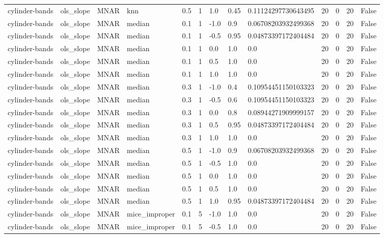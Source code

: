 \begin{tabular}{lllllllllllll}
cylinder-bands & ols\_slope & MNAR & knn & 0.5 & 1 & 1.0 & 0.45 & 0.11124297730643495 & 20 & 0 & 20 & False \\
cylinder-bands & ols\_slope & MNAR & median & 0.1 & 1 & -1.0 & 0.9 & 0.06708203932499368 & 20 & 0 & 20 & False \\
cylinder-bands & ols\_slope & MNAR & median & 0.1 & 1 & -0.5 & 0.95 & 0.04873397172404484 & 20 & 0 & 20 & False \\
cylinder-bands & ols\_slope & MNAR & median & 0.1 & 1 & 0.0 & 1.0 & 0.0 & 20 & 0 & 20 & False \\
cylinder-bands & ols\_slope & MNAR & median & 0.1 & 1 & 0.5 & 1.0 & 0.0 & 20 & 0 & 20 & False \\
cylinder-bands & ols\_slope & MNAR & median & 0.1 & 1 & 1.0 & 1.0 & 0.0 & 20 & 0 & 20 & False \\
cylinder-bands & ols\_slope & MNAR & median & 0.3 & 1 & -1.0 & 0.4 & 0.10954451150103323 & 20 & 0 & 20 & False \\
cylinder-bands & ols\_slope & MNAR & median & 0.3 & 1 & -0.5 & 0.6 & 0.10954451150103323 & 20 & 0 & 20 & False \\
cylinder-bands & ols\_slope & MNAR & median & 0.3 & 1 & 0.0 & 0.8 & 0.08944271909999157 & 20 & 0 & 20 & False \\
cylinder-bands & ols\_slope & MNAR & median & 0.3 & 1 & 0.5 & 0.95 & 0.04873397172404484 & 20 & 0 & 20 & False \\
cylinder-bands & ols\_slope & MNAR & median & 0.3 & 1 & 1.0 & 1.0 & 0.0 & 20 & 0 & 20 & False \\
cylinder-bands & ols\_slope & MNAR & median & 0.5 & 1 & -1.0 & 0.9 & 0.06708203932499368 & 20 & 0 & 20 & False \\
cylinder-bands & ols\_slope & MNAR & median & 0.5 & 1 & -0.5 & 1.0 & 0.0 & 20 & 0 & 20 & False \\
cylinder-bands & ols\_slope & MNAR & median & 0.5 & 1 & 0.0 & 1.0 & 0.0 & 20 & 0 & 20 & False \\
cylinder-bands & ols\_slope & MNAR & median & 0.5 & 1 & 0.5 & 1.0 & 0.0 & 20 & 0 & 20 & False \\
cylinder-bands & ols\_slope & MNAR & median & 0.5 & 1 & 1.0 & 0.95 & 0.04873397172404484 & 20 & 0 & 20 & False \\
cylinder-bands & ols\_slope & MNAR & mice\_improper & 0.1 & 5 & -1.0 & 1.0 & 0.0 & 20 & 0 & 20 & False \\
cylinder-bands & ols\_slope & MNAR & mice\_improper & 0.1 & 5 & -0.5 & 1.0 & 0.0 & 20 & 0 & 20 & False \\

\end{tabular}
